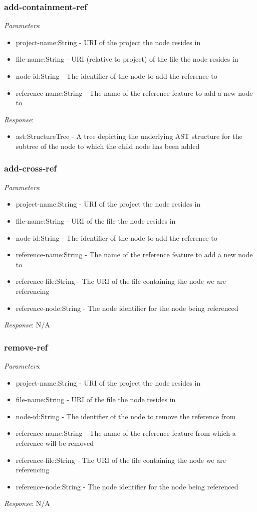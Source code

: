 \documentclass{report}
\begin{document}
\subsubsection{add-containment-ref}
\emph{Parameters}: 
\begin{itemize}
\item project-name:String - URI of the project the node resides in
\item file-name:String - URI (relative to project) of the file the node resides in
\item node-id:String - The identifier of the node to add the reference to
\item reference-name:String - The name of the reference feature to add a new node to
\end{itemize}
\emph{Response}: 
\begin{itemize}
\item ast:StructureTree - A tree depicting the underlying AST structure for the subtree of the node to which the child node has been added
\end{itemize}

\subsubsection{add-cross-ref}
\emph{Parameters}: 
\begin{itemize}
\item project-name:String - URI of the project the node resides in
\item file-name:String - URI of the file the node resides in
\item node-id:String - The identifier of the node to add the reference to
\item reference-name:String - The name of the reference feature to add a new node to
\item reference-file:String - The URI of the file containing the node we are referencing
\item reference-node:String - The node identifier for the node being referenced
\end{itemize}
\emph{Response}: N/A

\subsubsection{remove-ref}
\emph{Parameters}: 
\begin{itemize}
\item project-name:String - URI of the project the node resides in
\item file-name:String - URI of the file the node resides in
\item node-id:String - The identifier of the node to remove the reference from
\item reference-name:String - The name of the reference feature from which a reference will be removed
\item reference-file:String - The URI of the file containing the node we are referencing
\item reference-node:String - The node identifier for the node being referenced
\end{itemize}
\emph{Response}: N/A
\end{document}

